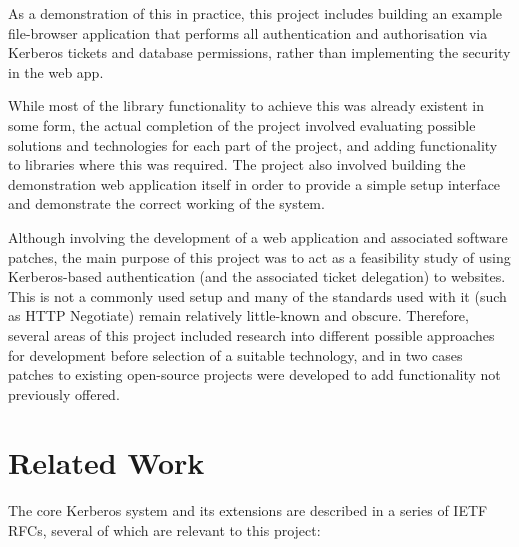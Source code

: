 \documentclass[12pt]{report}
\begin{document}
As a demonstration of this in practice, this project includes building an example file-browser application that performs all authentication and authorisation via Kerberos tickets and database permissions, rather than implementing the security in the web app.

While most of the library functionality to achieve this was already existent in some form, the actual completion of the project involved evaluating possible solutions and technologies for each part of the project, and adding functionality to libraries where this was required. The project also involved building the demonstration web application itself in order to provide a simple setup interface and demonstrate the correct working of the system.

Although involving the development of a web application and associated software patches, the main purpose of this project was to act as a feasibility study of using Kerberos-based authentication (and the associated ticket delegation) to websites. This is not a commonly used setup and many of the standards used with it (such as HTTP Negotiate) remain relatively little-known and obscure. Therefore, several areas of this project included research into different possible approaches for development before selection of a suitable technology, and in two cases patches to existing open-source projects were developed to add functionality not previously offered.

\section{Related Work}
The core Kerberos system and its extensions are described in a series of IETF RFCs, several of which are relevant to this project:
\end{document}

